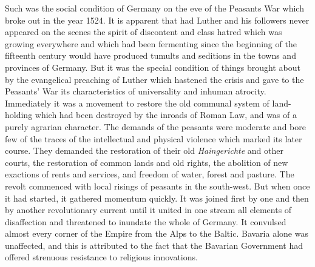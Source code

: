 \documentclass{book}
\begin{document}
Such was the social condition of Germany on the eve of the Peasants War which broke out in the year 1524. It is apparent that had Luther and his followers never appeared on the scenes the spirit of discontent and class hatred which was growing everywhere and which had been fermenting since the beginning of the fifteenth century would have produced tumults and seditions in the towns and provinces of Germany. But it was the special condition of things brought about by the evangelical preaching of Luther which hastened the crisis and gave to the Peasants’ War its characteristics of universality and inhuman atrocity. Immediately it was a movement to restore the old communal system of land-holding which had been destroyed by the inroads of Roman Law, and was of a purely agrarian character. The demands of the peasants were moderate and bore few of the traces of the intellectual and physical violence which marked its later course. They demanded the restoration of their old \emph{Haingerichte} and other courts, the restoration of common lands and old rights, the abolition of new exactions of rents and services, and freedom of water, forest and pasture. The revolt commenced with local risings of peasants in the south-west. But when once it had started, it gathered momentum quickly. It was joined first by one and then by another revolutionary current until it united in one stream all elements of disaffection and threatened to inundate the whole of Germany. It convulsed almost every corner of the Empire from the Alps to the Baltic. Bavaria alone was unaffected, and this is attributed to the fact that the Bavarian Government had offered strenuous resistance to religious innovations.
\end{document}
